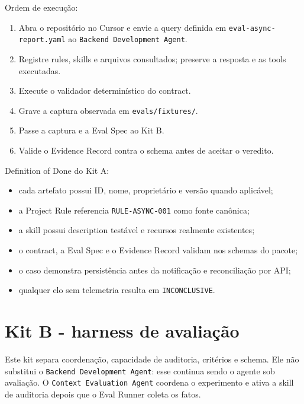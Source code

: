 \documentclass[
  10pt,
  a4paper,
  oneside]{book}
\providecommand{\tightlist}{%
  \setlength{\itemsep}{0pt}\setlength{\parskip}{0pt}}
\begin{document}
Ordem de execução:

\begin{enumerate}
\def\labelenumi{\arabic{enumi}.}
\tightlist
\item
  Abra o repositório no Cursor e envie a query definida em
  \texttt{eval-async-report.yaml} ao
  \texttt{Backend\ Development\ Agent}.
\item
  Registre rules, skills e arquivos consultados; preserve a resposta e
  as tools executadas.
\item
  Execute o validador determinístico do contract.
\item
  Grave a captura observada em \texttt{evals/fixtures/}.
\item
  Passe a captura e a Eval Spec ao Kit B.
\item
  Valide o Evidence Record contra o schema antes de aceitar o veredito.
\end{enumerate}

Definition of Done do Kit A:

\begin{itemize}
\tightlist
\item
  cada artefato possui ID, nome, proprietário e versão quando aplicável;
\item
  a Project Rule referencia \texttt{RULE-ASYNC-001} como fonte canônica;
\item
  a skill possui description testável e recursos realmente existentes;
\item
  o contract, a Eval Spec e o Evidence Record validam nos schemas do
  pacote;
\item
  o caso demonstra persistência antes da notificação e reconciliação por
  API;
\item
  qualquer elo sem telemetria resulta em \texttt{INCONCLUSIVE}.
\end{itemize}

\hypertarget{kit-b---harness-de-avaliauxe7uxe3o}{%
\section{Kit B - harness de
avaliação}\label{kit-b---harness-de-avaliauxe7uxe3o}}

Este kit separa coordenação, capacidade de auditoria, critérios e
schema. Ele não substitui o \texttt{Backend\ Development\ Agent}: esse
continua sendo o agente sob avaliação. O
\texttt{Context\ Evaluation\ Agent} coordena o experimento e ativa a
skill de auditoria depois que o Eval Runner coleta os fatos.
\end{document}
